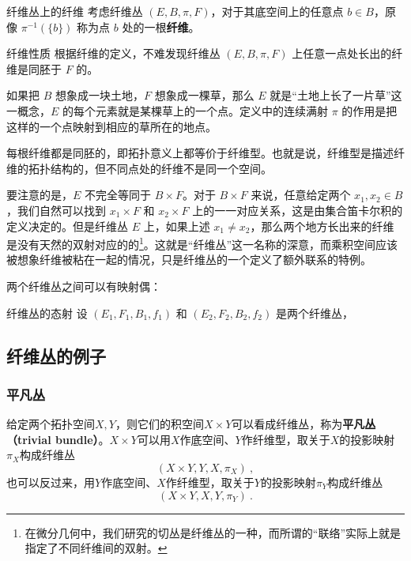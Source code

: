 \begin{definition}{纤维丛上的纤维}
考虑纤维丛 $(E, B, \pi, F)$，对于其底空间上的任意点 $b \in B$，原像 $\pi^{-1}(\{b\})$ 称为点 $b$ 处的一根\textbf{纤维}。
\end{definition}

\begin{corollary}{纤维性质}
根据纤维的定义，不难发现纤维丛 $(E, B, \pi, F)$ 上任意一点处长出的纤维是同胚于 $F$ 的。
\end{corollary}

如果把 $B$ 想象成一块土地，$F$ 想象成一棵草，那么 $E$ 就是“土地上长了一片草”这一概念，$E$ 的每个元素就是某棵草上的一个点。定义中的连续满射 $\pi$ 的作用是把这样的一个点映射到相应的草所在的地点。

每根纤维都是同胚的，即拓扑意义上都等价于纤维型。也就是说，纤维型是描述纤维的拓扑结构的，但不同点处的纤维不是同一个空间。

要注意的是，$E$ 不完全等同于 $B\times F$。对于 $B\times F$ 来说，任意给定两个 $x_1, x_2\in B$，我们自然可以找到 $x_1\times F$ 和 $x_2\times F$ 上的一一对应关系，这是由集合笛卡尔积的定义决定的。但是纤维丛 $E$ 上，如果上述 $x_1\not=x_2$，那么两个地方长出来的纤维是没有天然的双射对应的的\footnote{在微分几何中，我们研究的切丛是纤维丛的一种，而所谓的“联络”实际上就是指定了不同纤维间的双射。}。这就是“纤维丛”这一名称的深意，而乘积空间应该被想象纤维被粘在一起的情况，只是纤维丛的一个定义了额外联系的特例。

两个纤维丛之间可以有映射偶：

\begin{definition}{纤维丛的态射}
设 $(E_1, F_1, B_1, f_1)$ 和 $(E_2, F_2, B_2, f_2)$ 是两个纤维丛，
\end{definition}


\subsection{纤维丛的例子}

\subsubsection{平凡丛}


给定两个拓扑空间$X, Y$，则它们的积空间$X\times Y$可以看成纤维丛，称为\textbf{平凡丛（trivial bundle）}。$X\times Y$可以用$X$作底空间、$Y$作纤维型，取关于$X$的投影映射$\pi_X$构成纤维丛
\begin{equation}
(X\times Y, Y, X, \pi_X)~, 
\end{equation}
也可以反过来，用$Y$作底空间、$X$作纤维型，取关于$Y$的投影映射$\pi_Y$构成纤维丛
\begin{equation}
(X\times Y, X, Y, \pi_Y)~. 
\end{equation}


